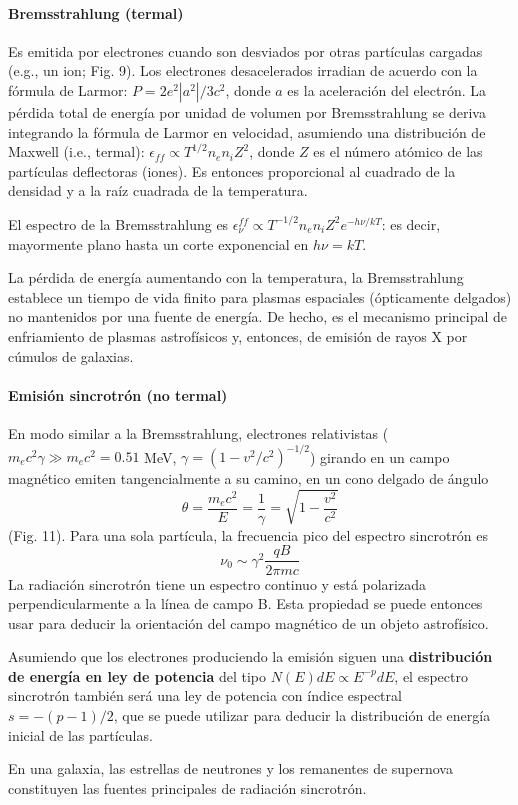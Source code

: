 \documentclass[11pt,letterpaper]{article}
\begin{document}
\paragraph{Bremsstrahlung (termal)}
Es emitida por electrones cuando son desviados por otras partículas cargadas (e.g., un ion; Fig. 9). Los electrones desacelerados irradian de acuerdo con la fórmula de Larmor: \(P = 2e^2|a^2|/3c^2\), donde \(a\) es la aceleración del electrón. La pérdida total de energía por unidad de volumen por Bremsstrahlung se deriva integrando la fórmula de Larmor en velocidad, asumiendo una distribución de Maxwell (i.e., termal): \(\epsilon_{ff} \propto T^{1/2} n_e n_i Z^2\), donde \(Z\) es el número atómico de las partículas deflectoras (iones). Es entonces proporcional al cuadrado de la densidad y a la raíz cuadrada de la temperatura.

El espectro de la Bremsstrahlung es \(\epsilon_\nu^{ff} \propto T^{-1/2} n_e n_i Z^2 e^{-h\nu/kT}\): es decir, mayormente plano hasta un corte exponencial en \(h\nu = kT\).

La pérdida de energía aumentando con la temperatura, la Bremsstrahlung establece un tiempo de vida finito para plasmas espaciales (ópticamente delgados) no mantenidos por una fuente de energía. De hecho, es el mecanismo principal de enfriamiento de plasmas astrofísicos y, entonces, de emisión de rayos X por cúmulos de galaxias.

\paragraph{Emisión sincrotrón (no termal)}
En modo similar a la Bremsstrahlung, electrones relativistas (\(m_e c^2 \gamma \gg m_e c^2 = 0.51\) MeV, \(\gamma = (1 - v^2/c^2)^{-1/2}\)) girando en un campo magnético emiten tangencialmente a su camino, en un cono delgado de ángulo
\begin{equation}
    \theta = \frac{m_e c^2}{E} = \frac{1}{\gamma} = \sqrt{1 - \frac{v^2}{c^2}}
\end{equation}
(Fig. 11). Para una sola partícula, la frecuencia pico del espectro sincrotrón es
\begin{equation}
    \nu_0 \sim \gamma^2 \frac{qB}{2\pi m c}
\end{equation}
La radiación sincrotrón tiene un espectro continuo y está polarizada perpendicularmente a la línea de campo B. Esta propiedad se puede entonces usar para deducir la orientación del campo magnético de un objeto astrofísico.

Asumiendo que los electrones produciendo la emisión siguen una \textbf{distribución de energía en ley de potencia} del tipo \(N(E)dE \propto E^{-p}dE\), el espectro sincrotrón también será una ley de potencia con índice espectral \(s = -(p - 1)/2\), que se puede utilizar para deducir la distribución de energía inicial de las partículas.

En una galaxia, las estrellas de neutrones y los remanentes de supernova constituyen las fuentes principales de radiación sincrotrón.
\end{document}
